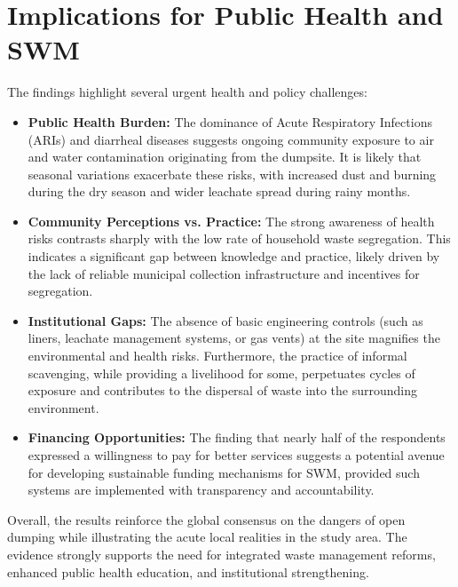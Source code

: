 \section{Implications for Public Health and SWM}
The findings highlight several urgent health and policy challenges:
\begin{itemize}
    \item \textbf{Public Health Burden:} The dominance of Acute Respiratory Infections (ARIs) and diarrheal diseases suggests ongoing community exposure to air and water contamination originating from the dumpsite. It is likely that seasonal variations exacerbate these risks, with increased dust and burning during the dry season and wider leachate spread during rainy months.
    
    \item \textbf{Community Perceptions vs. Practice:} The strong awareness of health risks contrasts sharply with the low rate of household waste segregation. This indicates a significant gap between knowledge and practice, likely driven by the lack of reliable municipal collection infrastructure and incentives for segregation.
    
    \item \textbf{Institutional Gaps:} The absence of basic engineering controls (such as liners, leachate management systems, or gas vents) at the site magnifies the environmental and health risks. Furthermore, the practice of informal scavenging, while providing a livelihood for some, perpetuates cycles of exposure and contributes to the dispersal of waste into the surrounding environment.
    
    \item \textbf{Financing Opportunities:} The finding that nearly half of the respondents expressed a willingness to pay for better services suggests a potential avenue for developing sustainable funding mechanisms for SWM, provided such systems are implemented with transparency and accountability.
\end{itemize}

Overall, the results reinforce the global consensus on the dangers of open dumping while illustrating the acute local realities in the study area. The evidence strongly supports the need for integrated waste management reforms, enhanced public health education, and institutional strengthening.

